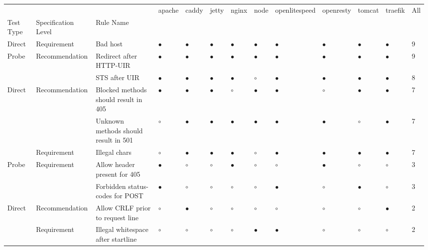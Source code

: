 \begin{tabular}{lllllllllllll}
\toprule
    &             &                              &     apache &      caddy &      jetty &      nginx &       node & openlitespeed &  openresty &     tomcat &    traefik &        All \\
Test Type & Specification Level & Rule Name &            &            &            &            &            &               &            &            &            &            \\
\midrule
Direct & Requirement & Bad host &  $\bullet$ &  $\bullet$ &  $\bullet$ &  $\bullet$ &  $\bullet$ &     $\bullet$ &  $\bullet$ &  $\bullet$ &  $\bullet$ &          9 \\
Probe & Recommendation & Redirect after HTTP-UIR &  $\bullet$ &  $\bullet$ &  $\bullet$ &  $\bullet$ &  $\bullet$ &     $\bullet$ &  $\bullet$ &  $\bullet$ &  $\bullet$ &          9 \\
    &             & STS after UIR\rlap{*} &  $\bullet$ &  $\bullet$ &  $\bullet$ &  $\bullet$ &    $\circ$ &     $\bullet$ &  $\bullet$ &  $\bullet$ &  $\bullet$ &          8 \\
Direct & Recommendation & Blocked methods should result in 405 &  $\bullet$ &  $\bullet$ &  $\bullet$ &    $\circ$ &  $\bullet$ &     $\bullet$ &    $\circ$ &  $\bullet$ &  $\bullet$ &          7 \\
    &             & Unknown methods should result in 501 &    $\circ$ &  $\bullet$ &  $\bullet$ &  $\bullet$ &  $\bullet$ &     $\bullet$ &  $\bullet$ &    $\circ$ &  $\bullet$ &          7 \\
    & Requirement & Illegal chars &    $\circ$ &  $\bullet$ &  $\bullet$ &  $\bullet$ &    $\circ$ &     $\bullet$ &  $\bullet$ &  $\bullet$ &  $\bullet$ &          7 \\
Probe & Requirement & Allow header present for 405 &  $\bullet$ &    $\circ$ &    $\circ$ &  $\bullet$ &    $\circ$ &       $\circ$ &  $\bullet$ &    $\circ$ &    $\circ$ &          3 \\
    &             & Forbidden status-codes for POST &  $\bullet$ &    $\circ$ &    $\circ$ &    $\circ$ &    $\circ$ &     $\bullet$ &    $\circ$ &  $\bullet$ &    $\circ$ &          3 \\
Direct & Recommendation & Allow CRLF prior to request line &    $\circ$ &  $\bullet$ &    $\circ$ &    $\circ$ &    $\circ$ &       $\circ$ &    $\circ$ &    $\circ$ &  $\bullet$ &          2 \\
    & Requirement & Illegal whitespace after startline &    $\circ$ &    $\circ$ &    $\circ$ &    $\circ$ &  $\bullet$ &     $\bullet$ &    $\circ$ &    $\circ$ &    $\circ$ &          2 \\

\end{tabular}
